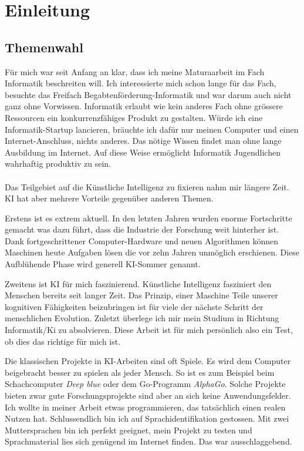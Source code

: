 \section{Einleitung}
\subsection{Themenwahl}
Für mich war seit Anfang an klar, dass ich meine Maturaarbeit im Fach Informatik beschreiten will. Ich interessierte mich schon lange für das Fach, besuchte das Freifach
Begabtenförderung-Informatik  und war darum auch nicht ganz ohne Vorwissen. Informatik erlaubt wie kein anderes Fach ohne grössere Ressourcen ein konkurrenzfähiges Produkt zu 
gestalten. Würde ich eine Informatik-Startup lancieren, bräuchte ich dafür nur meinen Computer und einen Internet-Anschluss, nichts anderes. Das nötige Wissen findet man ohne lange
Ausbildung im Internet. Auf diese Weise ermöglicht Informatik Jugendlichen wahrhaftig produktiv zu sein.
\\ \\ 
Das Teilgebiet auf die Künstliche Intelligenz zu fixieren nahm mir längere Zeit. KI hat aber mehrere Vorteile gegenüber anderen Themen. 

Erstens ist es extrem aktuell. In den letzten Jahren wurden enorme Fortschritte gemacht was dazu führt, dass die Industrie der Forschung weit hinterher ist. Dank fortgeschrittener
Computer-Hardware und neuen Algorithmen können Maschinen heute Aufgaben lösen die vor zehn Jahren unmöglich erschienen. Diese Aufblühende Phase wird generell KI-Sommer
genannt.

Zweitens ist KI für mich faszinierend. Künstliche Intelligenz fasziniert den Menschen bereits seit langer Zeit. Das Prinzip, einer Maschine Teile unserer kognitiven Fähigkeiten
beizubringen ist für viele der nächste Schritt der menschlichen Evolution.
Zuletzt überlege ich mir mein Studium in Richtung Informatik/Ki zu absolvieren. Diese Arbeit ist für mich persönlich also ein Test, ob dies das richtige für mich ist.

Die klassischen Projekte in KI-Arbeiten sind oft Spiele. Es wird dem Computer beigebracht besser zu spielen als jeder Mensch. So ist es zum Beispiel beim Schachcomputer
\textit{Deep blue}\parencite{deepblue} oder dem Go-Programm \textit{AlphaGo}\parencite{alphago}.
Solche Projekte bieten zwar gute Forschungsprojekte sind aber an sich keine Anwendungsfelder. Ich wollte in meiner Arbeit etwas programmieren, das tatsächlich einen realen Nutzen
hat.
Schlussendlich bin ich auf Sprachidentifikation gestossen. Mit zwei Muttersprachen bin ich perfekt geeignet, mein Projekt zu testen und Sprachmaterial lies sich genügend im Internet
finden. Das war ausschlaggebend.

